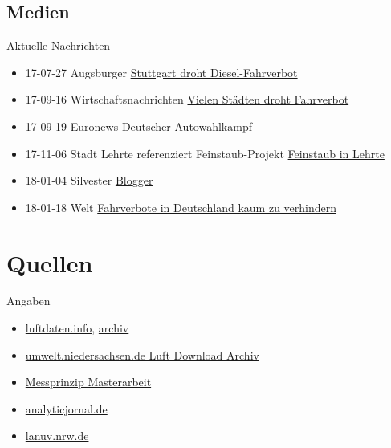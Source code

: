 \documentclass[aspectratio=169]{beamer} %
\begin{document}
\subsection{Medien}
\begin{frame}{Aktuelle Nachrichten}
  \begin{itemize}
  \item 17-07-27 Augsburger \href{http://www.augsburger-allgemeine.de/panorama/In-Stuttgart-droht-jetzt-ein-Diesel-Fahrverbot-id42204121.html}{Stuttgart droht Diesel-Fahrverbot}
  \item 17-09-16 Wirtschaftsnachrichten \href{https://deutsche-wirtschafts-nachrichten.de/2017/09/16/feinstaub-belastung-vielen-staedten-drohen-fahrverbote/}{Vielen Städten droht Fahrverbot}
  \item 17-09-19 Euronews \href{http://de.euronews.com/2017/09/19/der-deutsche-autowahlkampf}{Deutscher Autowahlkampf}
  \item 17-11-06 Stadt Lehrte referenziert Feinstaub-Projekt \href{http://piratenpartei-lehrte.de/2017/09/11/feinstaub-in-lehrte/}{Feinstaub in Lehrte}
  \item 18-01-04 Silvester \href{https://sbamueller.wordpress.com/2018/01/01/silvester-und-feinstaub/}{Blogger}
  \item 18-01-18 Welt \href{https://www.welt.de/wirtschaft/article172580444/Fahrverbote-kann-Deutschland-kaum-noch-verhindern.html}{Fahrverbote in Deutschland kaum zu verhindern}
  \end{itemize}
\end{frame}

\section{Quellen}
\begin{frame}{Angaben}
  \begin{itemize}
  \item \href{http://luftdaten.info/}{luftdaten.info}, \href{https://archive.luftdaten.info/}{archiv}
  \item \href{https://www.umwelt.niedersachsen.de/themen/luft/luen/aktuelle_messwerte/archiv/download/}{umwelt.niedersachsen.de Luft Download Archiv}
  \item \href{www.bund-neckar-alb.de/fileadmin/rv_neckar-alb/MasterarbeitBlonFeinstaubmessungimVergleich2017.pdf}{Messprinzip Masterarbeit}
  \item \href{www.analyticjournal.de/fachreports/grimm_nano_tubln_07_09/grimm_nano_pesch.pdf}{analyticjornal.de}
  \item \href{https://www.lanuv.nrw.de/fileadmin/lanuv/gesundheit/schadstoffe/gesundheitliche_wirkungen.pdf}{lanuv.nrw.de}
  \end{itemize}
\end{frame}
\end{document}
